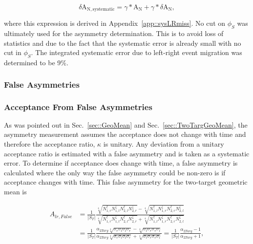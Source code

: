 \begin{equation}
  \delta \mathrm{A}_{\mathrm{N,systematic}} = \gamma *\mathrm{A}_{\mathrm{N}} +
  \gamma *\delta \mathrm{A}_{\mathrm{N}},
\end{equation}

\noindent
where this expression is derived in Appendix~\ref{app::sysLRmiss}.  No cut on
$\phi_{S}$ was ultimately used for the asymmetry determination.  This is to
avoid loss of statistics and due to the fact that the systematic error is
already small with no cut in $\phi_{S}$.  The integrated systematic error due to
left-right event migration was determined to be 9\%.


\subsubsection{False Asymmetries}
\subsubsection{Acceptance From False Asymmetries}
As was pointed out in Sec.~\ref{sec::GeoMean} and
Sec.~\ref{sec::TwoTargGeoMean}, the asymmetry measurement assumes the acceptance
does not change with time and therefore the acceptance ratio, $\kappa$ is
unitary.  Any deviation from a unitary acceptance ratio is estimated with a
false asymmetry and is taken as a systematic error.  To determine if acceptance
does change with time, a false asymmetry is calculated where the only way the
false asymmetry could be non-zero is if acceptance changes with time.  This
false asymmetry for the two-target geometric mean is

\begin{align}
  \label{equ::falseAcc}
  A_{lr,False} &= 
    \frac{1}{|S_T|}
    \frac{
      \sqrt[4]{
        N_{1,r}^\uparrow N_{1, l}^\downarrow
        N_{2,l}^\uparrow N_{2, r}^\downarrow
      } 
      -\sqrt[4]{
        N_{1,l}^\uparrow N_{1, r}^\downarrow
        N_{2,r}^\uparrow N_{2, l}^\downarrow
      }
    }{
      \sqrt[4]{
        N_{1,r}^\uparrow N_{1, l}^\downarrow
        N_{2,l}^\uparrow N_{2, r}^\downarrow
      } +
      \sqrt[4]{
        N_{1,l}^\uparrow N_{1, r}^\downarrow
        N_{2,r}^\uparrow N_{2, l}^\downarrow
      }
    } \\ \nonumber
    & =
    \frac{1}{|S_T|}
    \frac{
      \alpha_{2Targ} \sqrt[4]{\sigma_r\sigma_l\sigma_l\sigma_r} -
      \sqrt[4]{\sigma_l\sigma_r\sigma_r\sigma_l}
    }{
      \alpha_{2Targ} \sqrt[4]{\sigma_r\sigma_l\sigma_l\sigma_r} +
      \sqrt[4]{\sigma_l\sigma_r\sigma_r\sigma_l}
    }
    = \frac{1}{|S_T|}
    \frac{
      \alpha_{2Targ} - 1     
    }{
      \alpha_{2Targ} + 1
    },
\end{align}

